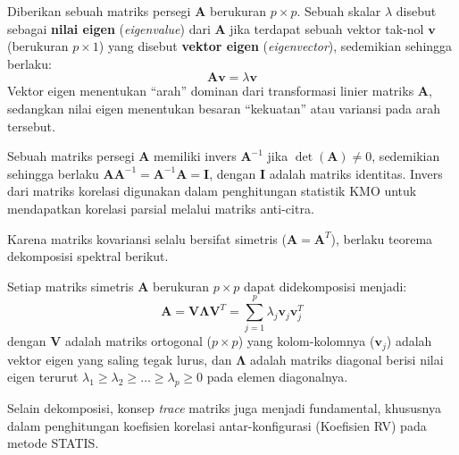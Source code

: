 \begin{definition}
  Diberikan sebuah matriks persegi $\mathbf{A}$ berukuran $p \times p$. Sebuah skalar $\lambda$ disebut sebagai \textbf{nilai eigen} (\textit{eigenvalue}) dari $\mathbf{A}$ jika terdapat sebuah vektor tak-nol $\mathbf{v}$ (berukuran $p \times 1$) yang disebut \textbf{vektor eigen} (\textit{eigenvector}), sedemikian sehingga berlaku:
  \begin{equation}
    \mathbf{A} \mathbf{v} = \lambda \mathbf{v}
  \end{equation}
  Vektor eigen menentukan ``arah'' dominan dari transformasi linier matriks $\mathbf{A}$, sedangkan nilai eigen menentukan besaran ``kekuatan'' atau variansi pada arah tersebut.
\end{definition}



\begin{definition}
  Sebuah matriks persegi $\mathbf{A}$ memiliki invers $\mathbf{A}^{-1}$ jika $\det(\mathbf{A}) \neq 0$, sedemikian sehingga berlaku $\mathbf{A} \mathbf{A}^{-1} = \mathbf{A}^{-1} \mathbf{A} = \mathbf{I}$, dengan $\mathbf{I}$ adalah matriks identitas. Invers dari matriks korelasi digunakan dalam penghitungan statistik KMO untuk mendapatkan korelasi parsial melalui matriks anti-citra.
\end{definition}

Karena matriks kovariansi selalu bersifat simetris ($\mathbf{A} = \mathbf{A}^T$), berlaku teorema dekomposisi spektral berikut.

\begin{theorem} \label{thm:spectral_decomposition}
  Setiap matriks simetris $\mathbf{A}$ berukuran $p \times p$ dapat didekomposisi menjadi:
  \begin{equation}
    \mathbf{A} = \mathbf{V} \mathbf{\Lambda} \mathbf{V}^T = \sum_{j=1}^{p} \lambda_j \mathbf{v}_j \mathbf{v}_j^T
  \end{equation}
  dengan $\mathbf{V}$ adalah matriks ortogonal ($p \times p$) yang kolom-kolomnya ($\mathbf{v}_j$) adalah vektor eigen yang saling tegak lurus, dan $\mathbf{\Lambda}$ adalah matriks diagonal berisi nilai eigen terurut $\lambda_1 \ge \lambda_2 \ge \dots \ge \lambda_p \ge 0$ pada elemen diagonalnya.
\end{theorem}

Selain dekomposisi, konsep \textit{trace} matriks juga menjadi fundamental, khususnya dalam penghitungan koefisien korelasi antar-konfigurasi (Koefisien RV) pada metode STATIS.

